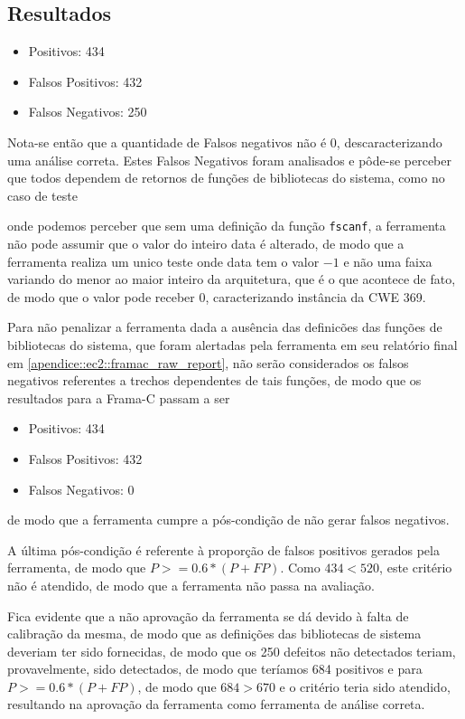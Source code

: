   \subsection{Resultados}
  \begin{itemize}
    \item Positivos: 434
    \item Falsos Positivos: 432
    \item Falsos Negativos: 250
  \end{itemize}

      Nota-se então que a quantidade de Falsos negativos não é 0, descaracterizando uma análise correta. Estes Falsos Negativos foram analisados e pôde-se perceber que todos dependem de retornos de funções de bibliotecas do sistema, como no caso de teste 
      
      onde podemos perceber que sem uma definição da função \lstinline{fscanf}, a ferramenta não pode assumir que o valor do inteiro data é alterado, de modo que a ferramenta realiza um unico teste onde data tem o valor $-1$ e não uma faixa variando do menor ao maior inteiro da arquitetura, que é o que acontece de fato, de modo que o valor pode receber 0, caracterizando instância da CWE 369. 

      Para não penalizar a ferramenta dada a ausência das definicões das funções de bibliotecas do sistema, que foram alertadas pela ferramenta em seu relatório final em \ref{apendice::ec2::framac_raw_report}, não serão considerados os falsos negativos referentes a trechos dependentes de tais funções, de modo que os resultados para a Frama-C passam a ser
      \begin{itemize}
        \item Positivos: 434
        \item Falsos Positivos: 432
        \item Falsos Negativos: 0
      \end{itemize}
      de modo que a ferramenta cumpre a pós-condição de não gerar falsos negativos.

      A última pós-condição é referente à proporção de falsos positivos gerados pela ferramenta, de modo que
      $P >= 0.6*(P + FP)$.
      Como 
      $434 < 520$,
      este critério não é atendido, de modo que a ferramenta não passa na avaliação.

      Fica evidente que a não aprovação da ferramenta se dá devido à falta de calibração da mesma, de modo que as definições das bibliotecas de sistema deveriam ter sido fornecidas, de modo que os 250 defeitos não detectados teriam, provavelmente, sido detectados, de modo que teríamos 684 positivos e para
      $P >= 0.6*(P + FP)$,
      de modo que
      $684 > 670$
      e o critério teria sido atendido, resultando na aprovação da ferramenta como ferramenta de análise correta.
